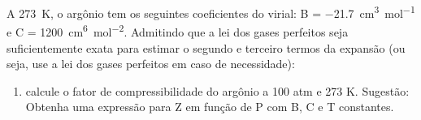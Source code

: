 \begin{xcs}
    A \qty{273}{K}, o argônio tem os seguintes coeficientes do virial: 
    B = \qty{-21,7}{cm^3 mol^{-1}} e C = \qty{1200}{cm^6 mol^{-2}}.
    Admitindo que a lei dos gases perfeitos seja
    suficientemente exata para estimar o segundo e terceiro termos da expansão
    (ou seja, use a lei dos gases perfeitos em caso de necessidade): 
    \begin{enumerate}[label=\alph*.]
        \item calcule o fator de compressibilidade do argônio a 100 atm e 273 K.
            Sugestão: Obtenha uma expressão para Z em função de P com B, C e T
            constantes. 
    \end{enumerate}
\end{xcs}
\begin{rsl}
    
\end{rsl}
